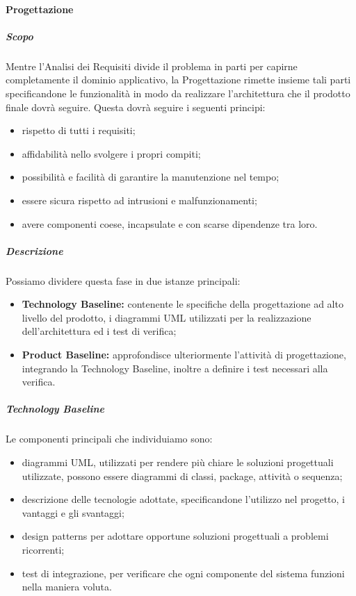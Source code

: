 \documentclass[]{article}
\begin{document}
					\paragraph{Progettazione}
						\subparagraph{Scopo}
						Mentre l'Analisi dei Requisiti divide il problema in parti per capirne completamente il dominio applicativo, la Progettazione rimette insieme tali parti specificandone le funzionalità in modo da realizzare l'architettura che il prodotto finale dovrà seguire. Questa dovrà seguire i seguenti principi:
						\begin{itemize}
							\item rispetto di tutti i requisiti;
							\item affidabilità nello svolgere i propri compiti;
							\item possibilità e facilità di garantire la manutenzione nel tempo;
							\item essere sicura rispetto ad intrusioni e malfunzionamenti;
							\item avere componenti coese, incapsulate e con scarse dipendenze tra loro.
						\end{itemize}
						\subparagraph{Descrizione}
						Possiamo dividere questa fase in due istanze principali:
						\begin{itemize}
							\item \textbf{Technology Baseline:} contenente le specifiche della progettazione ad alto livello del prodotto, i diagrammi UML utilizzati per la realizzazione dell'architettura ed i test di verifica;
							\item \textbf{Product Baseline:} approfondisce ulteriormente l'attività di progettazione, integrando la Technology Baseline, inoltre a definire i test necessari alla verifica.
						\end{itemize}
						\subparagraph{Technology Baseline}
						Le componenti principali che individuiamo sono:
						\begin{itemize}
							\item diagrammi UML, utilizzati per rendere più chiare le soluzioni progettuali utilizzate, possono essere diagrammi di classi, package, attività o sequenza;
							\item descrizione delle tecnologie adottate, specificandone l'utilizzo nel progetto, i vantaggi e gli svantaggi;
							\item design patterns per adottare opportune soluzioni progettuali a problemi ricorrenti;
							\item test di integrazione, per verificare che ogni componente del sistema funzioni nella maniera voluta.
						\end{itemize} 
\end{document}
